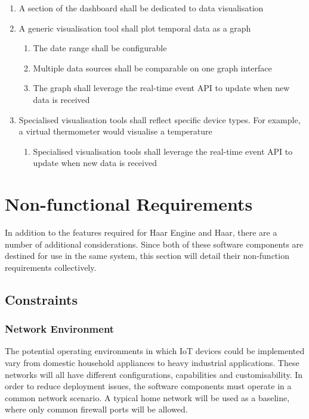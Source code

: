         \begin{enumerate}
          \item A section of the dashboard shall be dedicated to data visualisation
          \item A generic visualisation tool shall plot temporal data as a graph
          \begin{enumerate}
            \item The date range shall be configurable
            \item Multiple data sources shall be comparable on one graph interface
            \item The graph shall leverage the real-time event API to update when new data is received
          \end{enumerate}
          \item Specialised visualisation tools shall reflect specific device types. For example, a virtual thermometer would visualise a temperature
          \begin{enumerate}
            \item Specialised visualisation tools shall leverage the real-time event API to update when new data is received
          \end{enumerate}
        \end{enumerate}

  \section{Non-functional Requirements}
    In addition to the features required for Haar Engine and Haar, there are a number of additional considerations. Since both of these software components are destined for use in the same system, this section will detail their non-function requirements collectively.

    \subsection{Constraints}
      \subsubsection{Network Environment}
        The potential operating environments in which IoT devices could be implemented vary from domestic household appliances to heavy industrial applications. These networks will all have different configurations, capabilities and customisability. In order to reduce deployment issues, the software components must operate in a common network scenario. A typical home network will be used as a baseline, where only common firewall ports will be allowed.

